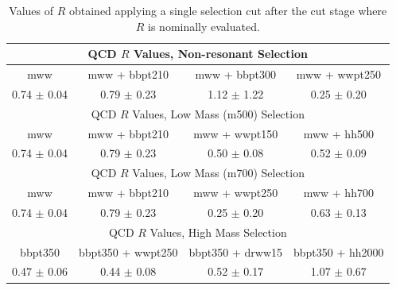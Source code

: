 \begin{table}[h!]
\centering

\begin{tabular}{c|c|c|c}
\hline\hline



\multicolumn{4}{c}{QCD $R$ Values, Non-resonant Selection}\\\hline\hline
mww 	                & mww + bbpt210 	& mww + bbpt300 	& mww + wwpt250 	\\\hline 
0.74 $\pm$ 0.04 	& 0.79 $\pm$ 0.23 	& 1.12 $\pm$ 1.22 	& 0.25 $\pm$ 0.20 	\\\hline \hline
\multicolumn{4}{c}{QCD $R$ Values, Low Mass (m500) Selection}\\\hline\hline
mww 	                & mww + bbpt210 	& mww + wwpt150 	& mww + hh500	  \\\hline 
0.74 $\pm$ 0.04 	& 0.79 $\pm$ 0.23 	& 0.50 $\pm$ 0.08 	& 0.52 $\pm$ 0.09  \\\hline \hline
\multicolumn{4}{c}{QCD $R$ Values, Low Mass (m700) Selection}\\\hline\hline
mww 	                & mww + bbpt210 	& mww + wwpt250 	& mww + hh700	  \\\hline 
0.74 $\pm$ 0.04 	& 0.79 $\pm$ 0.23 	& 0.25 $\pm$ 0.20 	& 0.63 $\pm$ 0.13  \\\hline \hline
\multicolumn{4}{c}{QCD $R$ Values, High Mass Selection}\\\hline\hline
bbpt350 	        & bbpt350 + wwpt250 	& bbpt350 + drww15 	& bbpt350 + hh2000	\\\hline 
0.47 $\pm$ 0.06 	& 0.44 $\pm$ 0.08 	& 0.52 $\pm$ 0.17	& 1.07 $\pm$ 0.67 	\\\hline 

\hline\hline
\end{tabular}

\caption{Values of $R$ obtained applying a single selection cut after the cut stage where $R$ is nominally evaluated.} \label{tab:R_after_X}
\end{table}


